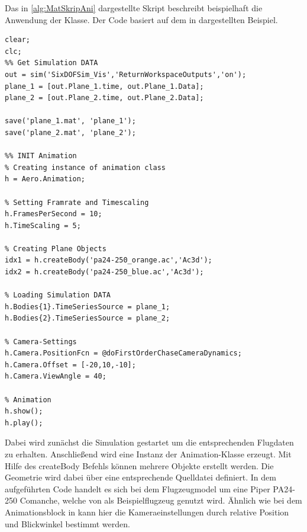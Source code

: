 Das in \ref{alg:MatSkripAni} dargestellte Skript beschreibt beispielhaft die Anwendung der Klasse. Der Code basiert auf dem in \cite{AeroAniOverlay} dargestellten Beispiel.
%
\begin{lstlisting}[style=Matlab_colored, caption = {\Matlab-Skript zum Erstellen einer Animation über die Aero.Animation-Klasse}, label={lst:AeroAnimationSkript}]
clear;
clc;
%% Get Simulation DATA
out = sim('SixDOFSim_Vis','ReturnWorkspaceOutputs','on');
plane_1 = [out.Plane_1.time, out.Plane_1.Data];
plane_2 = [out.Plane_2.time, out.Plane_2.Data];

save('plane_1.mat', 'plane_1');
save('plane_2.mat', 'plane_2');

%% INIT Animation
% Creating instance of animation class
h = Aero.Animation; 

% Setting Framrate and Timescaling
h.FramesPerSecond = 10;
h.TimeScaling = 5;

% Creating Plane Objects
idx1 = h.createBody('pa24-250_orange.ac','Ac3d');
idx2 = h.createBody('pa24-250_blue.ac','Ac3d');

% Loading Simulation DATA
h.Bodies{1}.TimeSeriesSource = plane_1;
h.Bodies{2}.TimeSeriesSource = plane_2;

% Camera-Settings
h.Camera.PositionFcn = @doFirstOrderChaseCameraDynamics;
h.Camera.Offset = [-20,10,-10];
h.Camera.ViewAngle = 40;

% Animation
h.show();
h.play();

\end{lstlisting}

Dabei wird zunächst die Simulation gestartet um die entsprechenden Flugdaten zu erhalten. Anschließend wird eine Instanz der Animation-Klasse erzeugt. Mit Hilfe des createBody Befehls können mehrere Objekte erstellt werden. Die Geometrie wird dabei über eine entsprechende Quelldatei definiert. In dem aufgeführten Code handelt es sich bei dem Flugzeugmodel um eine Piper PA24-250 Comanche, welche von \Matlab als Beispielflugzeug genutzt wird. Ähnlich wie bei dem Animationsblock in \MatSim kann hier die Kameraeinstellungen durch relative Position und Blickwinkel bestimmt werden.

